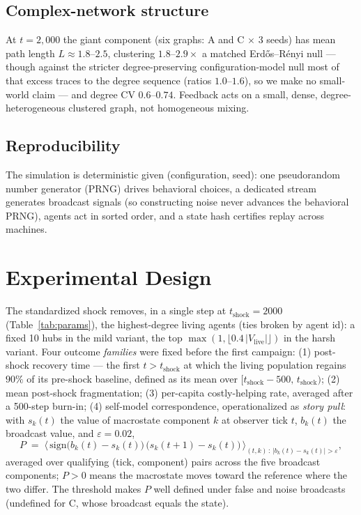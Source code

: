 \documentclass{svproc}
\begin{document}
\subsection{Complex-network structure}
At $t=2{,}000$ the giant component (six graphs: A and C $\times$ 3 seeds) has
mean path length $L\approx1.8$--$2.5$, clustering $1.8$--$2.9\times$ a matched
Erd\H{o}s--R\'enyi null --- though against the stricter degree-preserving
configuration-model null
most of that excess traces to the degree sequence (ratios $1.0$--$1.6$), so we
make no small-world claim --- and degree CV $0.6$--$0.74$. Feedback acts on a
small, dense, degree-heterogeneous clustered graph, not homogeneous mixing.

\subsection{Reproducibility}
The simulation is deterministic given (configuration, seed): one
pseudorandom number generator (PRNG) drives
behavioral choices, a dedicated stream generates broadcast signals (so
constructing noise never advances the behavioral PRNG), agents act in sorted
order, and a state hash certifies replay across machines.

\section{Experimental Design}
The standardized shock removes, in a single step at $t_{\mathrm{shock}}=2000$
(Table~\ref{tab:params}), the
highest-degree living agents (ties broken by agent id): a fixed 10 hubs in
the mild variant, the top $\max(1, \lfloor 0.4\,|V_{\mathrm{live}}|\rfloor)$ in the
harsh variant. Four outcome \emph{families} were fixed before the first
campaign: (1) post-shock recovery time --- the first $t > t_{\mathrm{shock}}$
at which the living population regains $90\%$ of its pre-shock baseline,
defined as its mean over $[t_{\mathrm{shock}}{-}500,\, t_{\mathrm{shock}})$;
(2) mean post-shock fragmentation; (3) per-capita costly-helping rate,
averaged after a 500-step burn-in; (4)
self-model correspondence, operationalized as \emph{story pull}: with
$s_k(t)$ the value of macrostate component $k$ at observer tick $t$,
$b_k(t)$ the broadcast value, and $\varepsilon=0.02$,
\begin{equation}
P \;=\; \Big\langle\, \mathrm{sign}\big(b_k(t)-s_k(t)\big)\,
\big(s_k(t{+}1)-s_k(t)\big) \,\Big\rangle_{(t,k)\,:\,|b_k(t)-s_k(t)|>\varepsilon},
\label{eq:pull}
\end{equation}
averaged over qualifying (tick, component) pairs across the five broadcast
components; $P>0$ means the macrostate moves toward the reference where the
two differ. The threshold makes $P$ well defined under false and noise
broadcasts (undefined for C, whose broadcast equals the state).
\end{document}
